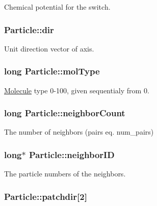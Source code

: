 Chemical potential for the switch. 

\hypertarget{class_particle_a6c8d0f728a634e7ec018fa25e8d59fc6}{
\subsubsection[{dir}]{ Particle\+::dir}}\label{class_particle_a6c8d0f728a634e7ec018fa25e8d59fc6}


Unit direction vector of axis. 

\hypertarget{class_particle_a6a469f985209c064c1e180b019f741be}{
\subsubsection[{mol\+Type}]{\setlength{\rightskip}{0pt plus 5cm}long Particle\+::mol\+Type}}\label{class_particle_a6a469f985209c064c1e180b019f741be}


\hyperlink{class_molecule}{Molecule} type 0-\/100, given sequentialy from 0. 

\hypertarget{class_particle_a66f7e76a4292ea79499e062667a46409}{
\subsubsection[{neighbor\+Count}]{\setlength{\rightskip}{0pt plus 5cm}long Particle\+::neighbor\+Count}}\label{class_particle_a66f7e76a4292ea79499e062667a46409}


The number of neighbors (pairs eq. num\+\_\+pairs) 

\hypertarget{class_particle_a0d119c0ca1644995840d35b701afb566}{
\subsubsection[{neighbor\+I\+D}]{\setlength{\rightskip}{0pt plus 5cm}long$\ast$ Particle\+::neighbor\+I\+D}}\label{class_particle_a0d119c0ca1644995840d35b701afb566}


The particle numbers of the neighbors. 

\hypertarget{class_particle_a079cbdc927c2390bfbf1aeed90bb94e6}{
\subsubsection[{patchdir}]{ Particle\+::patchdir\mbox{[}2\mbox{]}}}\label{class_particle_a079cbdc927c2390bfbf1aeed90bb94e6}



